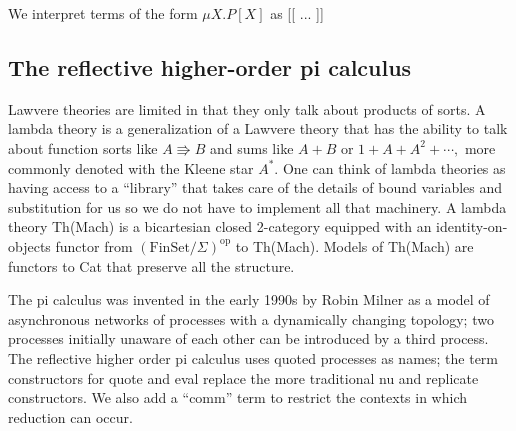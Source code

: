 \documentclass{article}
\newcommand{\FinSet}{\mathrm{FinSet}}
\newcommand{\op}{\mathrm{op}}
\begin{document}
We interpret terms of the form $\mu X.P[X]$ as [[ ... ]]

\subsection{The reflective higher-order pi calculus}

Lawvere theories are limited in that they only talk about products of sorts.  A lambda theory is a generalization of a Lawvere theory that has the ability to talk about function sorts like $A \Rrightarrow B$ and sums like $A+B$ or $1 + A + A^2 + \cdots,$ more commonly denoted with the Kleene star $A^*.$  One can think of lambda theories as having access to a ``library'' that takes care of the details of bound variables and substitution for us so we do not have to implement all that machinery.  A lambda theory Th(Mach) is a bicartesian closed 2-category equipped with an identity-on-objects functor from $(\FinSet/\Sigma)^{\op}$ to Th(Mach).  Models of Th(Mach) are functors to Cat that preserve all the structure.

The pi calculus was invented in the early 1990s by Robin Milner as a model of asynchronous networks of processes with a dynamically changing topology; two processes initially unaware of each other can be introduced by a third process.  The reflective higher order pi calculus uses quoted processes as names; the term constructors for quote and eval replace the more traditional nu and replicate constructors.  We also add a ``comm'' term to restrict the contexts in which reduction can occur.
\end{document}
